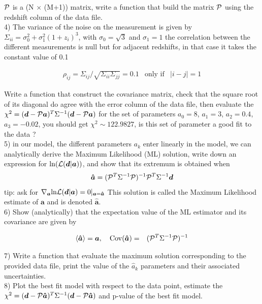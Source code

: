 \documentclass[a4paper]{article}
\def\ba{\begin{eqnarray}}
\def\ea{\end{eqnarray}}
\begin{document}
$ {\cal P}$ is a (N $\times$ (M+1)) matrix, write a function that build the matrix ${\cal P}$ using the redshift column of the data file. \\

4) The variance of the noise on the measurement is given by $ \Sigma_{ii} =  \sigma_{0}^{2} + \sigma_{1}^{2} (1+z_{i})^{3}$, with $\sigma_{0} = \sqrt{3}$ and  $\sigma_{1} = 1$   the correlation between the different measurements is null but for adjacent redshifts, in that case it takes the constant value of 0.1

\ba
\rho_{ij} = \Sigma_{ij}/\sqrt{\Sigma_{ii}\Sigma_{jj}}= 0.1& \mbox{only if} & |i-j|=1 
\ea

Write a function that construct the covariance matrix, check that the square root of its diagonal do agree with the error column of the data file, then evaluate the $\chi^{2} = ({\bm d}  - {\cal P}\bm{a})^{T} \Sigma^{-1} ({\bm d}  - {\cal P}\bm{a})$ for the set of parameters $a_{0}= 8$, $a_{1}=3$, $a_{2}=0.4$, $a_{3} = -0.02$,  you should get $\chi^{2} \sim 122.9827$, is this set of parameter a good fit to the data ? \\

5) in our model, the different parameters $a_{k}$ enter linearly in the model,  we can analytically derive the Maximum Likelihood (ML) solution, write down an expression for $\ln({\cal L}({\bm d} |  {\bm a}))$, and show that its extremum is obtained when 
\ba
   \bm{\hat{a}} = ( {\cal P}^{T}  \Sigma^{-1}{\cal P})^{-1}{\cal P}^{T}  \Sigma^{-1} \bm{d} 
\ea
tip: ask for $ \nabla_{ \bm{a} } {\rm ln}{\cal L}(\bm{d} | \bm{a})=0 |_{    \bm{a} =   \bm{\hat{a}}}$
This solution is called the Maximum Likelihood estimate of $\bm{a} $ and is denoted $\bm{\hat{a}}$. \\

6) Show (analytically) that the expectation value of the ML estimator and its covariance are given by

\ba
\langle  \bm{\hat{a}}  \rangle= \bm{a},  \ \ \
{\rm Cov}(\bm{\hat{a}}) &=&  ( {\cal P}^{T}  \Sigma^{-1}{\cal P})^{-1}
\ea

7) Write a function that evaluate the maximum solution corresponding to the provided data file, print the value of the  $\hat{a}_{k}$ parameters and their associated uncertainties. \\

8) Plot the best fit model with respect to the data point, estimate the  $\chi^{2} = ({\bm d}  - {\cal P}\bm{\hat{a}})^{T} \Sigma^{-1} ({\bm d}  - {\cal P}\bm{\hat{a}})$ and p-value of the best fit model. \\
\end{document}
